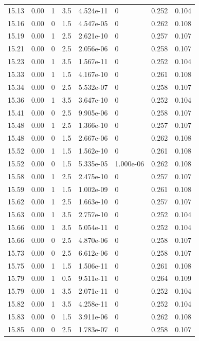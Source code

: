\documentclass[preview]{standalone}
\begin{document}
{{{{{{{{{{{{\begin{tabular}{L{1.2cm}C{1.2cm} C{0.3cm}C{0.5cm} C{1.4cm}C{1.4cm} C{1.4cm}C{1.4cm}}
  15.13  &  0.00  & 1     & 3.5 &  4.524e-11  & 0  & 0.252 &  0.104   \\ 
  15.16  &  0.00  & 0     & 1.5 &  4.547e-05  & 0  & 0.262 &  0.108   \\ 
  15.19  &  0.00  & 1     & 2.5 &  2.621e-10  & 0  & 0.257 &  0.107   \\ 
  15.21  &  0.00  & 0     & 2.5 &  2.056e-06  & 0  & 0.258 &  0.107   \\ 
  15.23  &  0.00  & 1     & 3.5 &  1.567e-11  & 0  & 0.252 &  0.104   \\ 
  15.33  &  0.00  & 1     & 1.5 &  4.167e-10  & 0  & 0.261 &  0.108   \\ 
  15.34  &  0.00  & 0     & 2.5 &  5.532e-07  & 0  & 0.258 &  0.107   \\ 
  15.36  &  0.00  & 1     & 3.5 &  3.647e-10  & 0  & 0.252 &  0.104   \\ 
  15.41  &  0.00  & 0     & 2.5 &  9.905e-06  & 0  & 0.258 &  0.107   \\ 
  15.48  &  0.00  & 1     & 2.5 &  1.366e-10  & 0  & 0.257 &  0.107   \\ 
  15.48  &  0.00  & 0     & 1.5 &  2.667e-06  & 0  & 0.262 &  0.108   \\ 
  15.52  &  0.00  & 1     & 1.5 &  1.562e-10  & 0  & 0.261 &  0.108   \\ 
  15.52  &  0.00  & 0     & 1.5 &  5.335e-05  & 1.000e-06  & 0.262 &  0.108   \\ 
  15.58  &  0.00  & 1     & 2.5 &  2.475e-10  & 0  & 0.257 &  0.107   \\ 
  15.59  &  0.00  & 1     & 1.5 &  1.002e-09  & 0  & 0.261 &  0.108   \\ 
  15.62  &  0.00  & 1     & 2.5 &  1.663e-10  & 0  & 0.257 &  0.107   \\ 
  15.63  &  0.00  & 1     & 3.5 &  2.757e-10  & 0  & 0.252 &  0.104   \\ 
  15.66  &  0.00  & 1     & 3.5 &  5.054e-11  & 0  & 0.252 &  0.104   \\ 
  15.66  &  0.00  & 0     & 2.5 &  4.870e-06  & 0  & 0.258 &  0.107   \\ 
  15.73  &  0.00  & 0     & 2.5 &  6.612e-06  & 0  & 0.258 &  0.107   \\ 
  15.75  &  0.00  & 1     & 1.5 &  1.506e-11  & 0  & 0.261 &  0.108   \\ 
  15.79  &  0.00  & 1     & 0.5 &  9.511e-11  & 0  & 0.264 &  0.109   \\ 
  15.79  &  0.00  & 1     & 3.5 &  2.071e-11  & 0  & 0.252 &  0.104   \\ 
  15.82  &  0.00  & 1     & 3.5 &  4.258e-11  & 0  & 0.252 &  0.104   \\ 
  15.83  &  0.00  & 0     & 1.5 &  3.911e-06  & 0  & 0.262 &  0.108   \\ 
  15.85  &  0.00  & 0     & 2.5 &  1.783e-07  & 0  & 0.258 &  0.107   \\ 
\hline 
\end{tabular} 

}}}}}}}}}}}}
\end{document}
